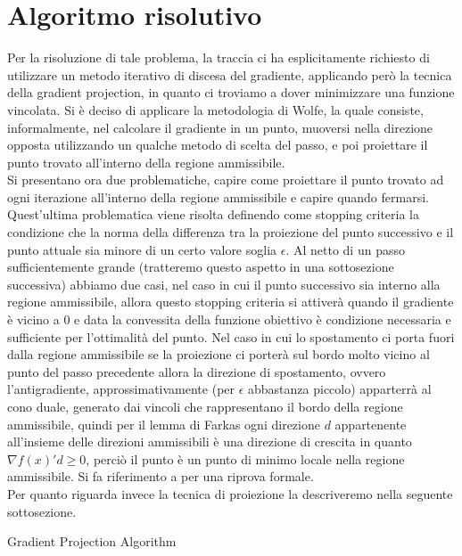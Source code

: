 \documentclass{article}
\begin{document}
\section{Algoritmo risolutivo}
Per la risoluzione di tale problema, la traccia ci ha esplicitamente richiesto di utilizzare un metodo iterativo di discesa del gradiente, applicando però la tecnica della gradient projection, in quanto ci troviamo a dover minimizzare una funzione vincolata. Si è deciso di applicare la metodologia di Wolfe, la quale consiste, informalmente, nel calcolare il gradiente in un punto, muoversi nella direzione opposta utilizzando un qualche metodo di scelta del passo, e poi proiettare il punto trovato all'interno della regione ammissibile.\\
Si presentano ora due problematiche, capire come proiettare il punto trovato ad ogni iterazione all'interno della regione ammissibile e capire quando fermarsi.
Quest'ultima problematica viene risolta definendo come stopping criteria la condizione che la norma della differenza tra la proiezione del punto successivo e il punto attuale sia minore di un certo valore soglia $\epsilon$. Al netto di un passo sufficientemente grande (tratteremo questo aspetto in una sottosezione successiva) abbiamo due casi, nel caso in cui il punto successivo sia interno alla regione ammissibile, allora questo stopping criteria si attiverà quando il gradiente è vicino a 0 e data la convessita della funzione obiettivo è condizione necessaria e sufficiente per l'ottimalità del punto. Nel caso in cui lo spostamento ci porta fuori dalla regione ammissibile se la proiezione ci porterà sul bordo molto vicino al punto del passo precedente allora la direzione di spostamento, ovvero l'antigradiente, approssimativamente (per $\epsilon$ abbastanza piccolo) apparterrà al cono duale, generato dai vincoli che rappresentano il bordo della regione ammissibile, quindi per il lemma di Farkas ogni direzione $d$ appartenente all'insieme delle direzioni ammissibili è una direzione di crescita in quanto $\nabla f(x)'d \geq 0$, perciò il punto è un punto di minimo locale nella regione ammissibile. Si fa riferimento a \cite{pgm_method} per una riprova formale.\\
Per quanto riguarda invece la tecnica di proiezione la descriveremo nella seguente sottosezione.
\begin{algorithm}
\caption{Gradient Projection Algorithm}

\end{algorithm}
\end{document}
